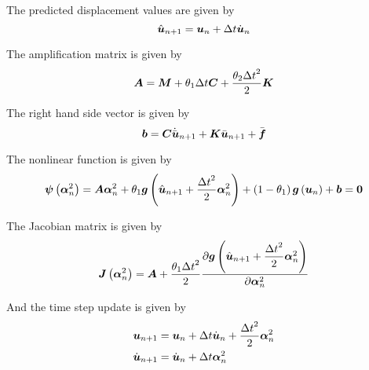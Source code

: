 The predicted displacement values are given by
\begin{equation}
   \hat{\vect{u}}_{n+1} = \vect{u}_{n}+\Delta t\dot{\vect{u}}_{n}
\end{equation}

The amplification matrix is given by
\begin{equation}
  \matr{A}=\matr{M}+\theta_{1}\Delta t\matr{C}+\dfrac{\theta_{2}{\Delta t}^{2}}{2}\matr{K}
\end{equation}

The right hand side vector is given by
\begin{equation}
  \vect{b}=\matr{C}\dot{\bar{\vect{u}}}_{n+1}+\matr{K}\bar{\vect{u}}_{n+1}+\bar{\vect{f}}
\end{equation}

The nonlinear function is given by
\begin{equation}
  \fnof{\vect{\psi}}{\vect{\alpha}^{2}_{n}}=\matr{A}\vect{\alpha}^{2}_{n}+\theta_{1}\fnof{\vect{g}}{\hat{\vect{u}}_{n+1}+ 
    \dfrac{{\Delta t}^{2}}{2}\vect{\alpha}^{2}_{n}}+\pbrac{1-\theta_{1}}\fnof{\vect{g}}{\vect{u}_{n}}+\vect{b}=\vect{0}
\end{equation}

The Jacobian matrix is given by
\begin{equation}
  \fnof{\matr{J}}{\vect{\alpha}^{2}_{n}}=\matr{A}+\dfrac{\theta_{1}{\Delta t}^{2}}{2}
  \delby{\fnof{\vect{g}}{{\hat{\vect{u}}_{n+1}+\dfrac{{\Delta t}^{2}}{2}\vect{\alpha}^{2}_{n}}}}{\vect{\alpha}^{2}_{n}}
\end{equation}

And the time step update is given by
\begin{equation}
  \begin{split}
    \vect{u}_{n+1} &= \vect{u}_{n}+\Delta t\dot{\vect{u}}_{n} +\dfrac{{\Delta t}^{2}}{2}\vect{\alpha}^{2}_{n} \\
    \dot{\vect{u}}_{n+1} &= \dot{\vect{u}}_{n}+\Delta t\vect{\alpha}^{2}_{n} 
  \end{split}
\end{equation}

